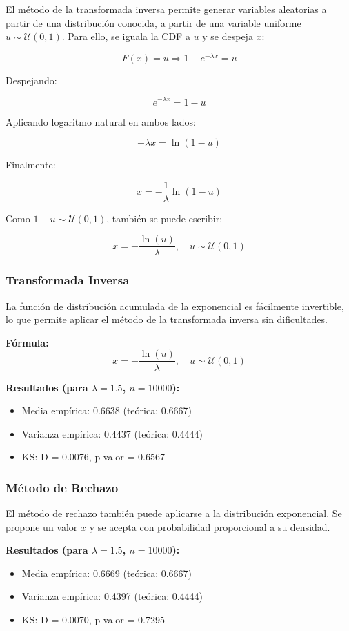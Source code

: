 \documentclass{article}
\begin{document}
El método de la transformada inversa permite generar variables aleatorias a partir de una distribución conocida, a partir de una variable uniforme $u \sim \mathcal{U}(0,1)$. Para ello, se iguala la CDF a $u$ y se despeja $x$:

\[
F(x) = u \Rightarrow 1 - e^{-\lambda x} = u
\]

Despejando:

\[
e^{-\lambda x} = 1 - u
\]

Aplicando logaritmo natural en ambos lados:

\[
-\lambda x = \ln(1 - u)
\]

Finalmente:

\[
x = -\frac{1}{\lambda} \ln(1 - u)
\]

Como $1 - u \sim \mathcal{U}(0,1)$, también se puede escribir:

\[
x = -\frac{\ln(u)}{\lambda}, \quad u \sim \mathcal{U}(0,1)
\]

\subsubsection{Transformada Inversa}

La función de distribución acumulada de la exponencial es fácilmente invertible, lo que permite aplicar el método de la transformada inversa sin dificultades.

\textbf{Fórmula:}
\[
x = -\frac{\ln(u)}{\lambda}, \quad u \sim \mathcal{U}(0,1)
\]

\textbf{Resultados (para $\lambda=1.5$, $n=10000$):}

\begin{itemize}
  \item Media empírica: 0.6638 (teórica: 0.6667)
  \item Varianza empírica: 0.4437 (teórica: 0.4444)
  \item KS: D = 0.0076, p-valor = 0.6567
\end{itemize}

\subsubsection{Método de Rechazo}

El método de rechazo también puede aplicarse a la distribución exponencial. Se propone un valor $x$ y se acepta con probabilidad proporcional a su densidad.

\textbf{Resultados (para $\lambda=1.5$, $n=10000$):}

\begin{itemize}
  \item Media empírica: 0.6669 (teórica: 0.6667)
  \item Varianza empírica: 0.4397 (teórica: 0.4444)
  \item KS: D = 0.0070, p-valor = 0.7295
\end{itemize}
\end{document}
